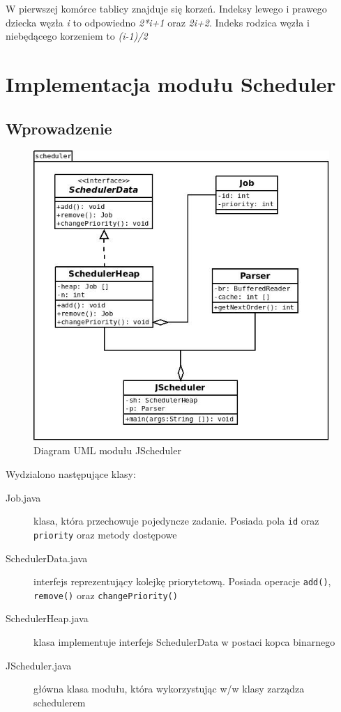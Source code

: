 \documentclass[12pt,a4paper]{article}
\begin{document}
W pierwszej komórce tablicy znajduje się korzeń. Indeksy lewego i prawego dziecka węzła \textit{i} to odpowiedno
 \textit{2*i+1} oraz \textit{2i+2}. Indeks rodzica węzła i niebędącego korzeniem to \textit{(i-1)/2}

\section{Implementacja modułu Scheduler}

\subsection{Wprowadzenie}

\begin{figure}[h]
	\centering
	\includegraphics[scale=0.5]{img/diagram.jpg} 
	\caption{Diagram UML modułu JScheduler}
\end{figure}

Wydzialono następujące klasy:

\begin{description}
	\item [Job.java] klasa, która przechowuje pojedyncze zadanie. Posiada pola \texttt{id} oraz \texttt{priority} oraz metody dostępowe
	\item [SchedulerData.java] interfejs reprezentujący kolejkę priorytetową. Posiada operacje \texttt{add()}, \texttt{remove()} oraz \texttt{changePriority()}
	\item [SchedulerHeap.java] klasa implementuje interfejs SchedulerData w postaci kopca binarnego
	\item [JScheduler.java] główna klasa modułu, która wykorzystując w/w klasy zarządza schedulerem
\end{description}
\end{document}
